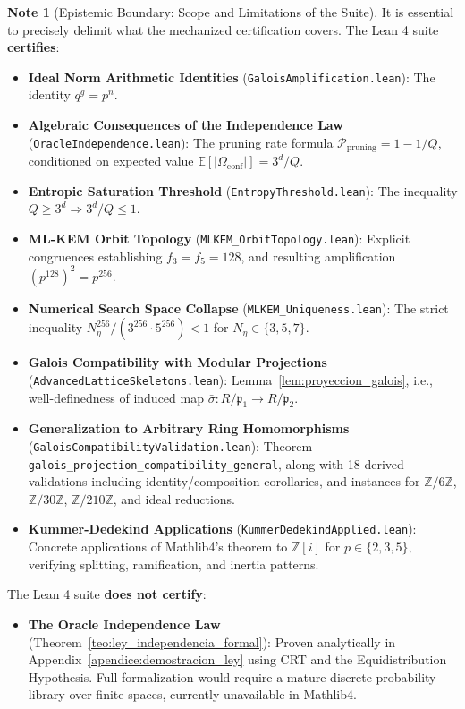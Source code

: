 \documentclass[11pt,a4paper]{article}
\theoremstyle{plain}
\theoremstyle{definition}
\newtheorem{remark}[teorema]{Note}
\numberwithin{equation}{section}
\newcommand{\ZZ}{\mathbb{Z}}
\newcommand{\fkp}{\mathfrak{p}}
\newcommand{\E}{\mathbb{E}}
\begin{document}
\begin{remark}[Epistemic Boundary: Scope and Limitations of the Suite]
\label{rem:frontera_lean}
It is essential to precisely delimit what the mechanized certification covers. The Lean 4 suite \textbf{certifies}:
\begin{itemize}
    \item \textbf{Ideal Norm Arithmetic Identities} (\texttt{GaloisAmplification.lean}): The identity $q^g = p^n$.
    \item \textbf{Algebraic Consequences of the Independence Law} (\texttt{OracleIndependence.lean}): The pruning rate formula $\mathcal{P}_{\text{pruning}} = 1 - 1/Q$, conditioned on expected value $\E[|\Omega_{\text{conf}}|] = 3^d/Q$.
    \item \textbf{Entropic Saturation Threshold} (\texttt{EntropyThreshold.lean}): The inequality $Q \ge 3^d \Rightarrow 3^d/Q \le 1$.
    \item \textbf{ML-KEM Orbit Topology} (\texttt{MLKEM\_OrbitTopology.lean}): Explicit congruences establishing $f_3 = f_5 = 128$, and resulting amplification $(p^{128})^2 = p^{256}$.
    \item \textbf{Numerical Search Space Collapse} (\texttt{MLKEM\_Uniqueness.lean}): The strict inequality $N_\eta^{256}/(3^{256} \cdot 5^{256}) < 1$ for $N_\eta \in \{3, 5, 7\}$.
    \item \textbf{Galois Compatibility with Modular Projections} (\texttt{AdvancedLatticeSkeletons.lean}): Lemma~\ref{lem:proyeccion_galois}, i.e., well-definedness of induced map $\bar{\sigma}: R/\fkp_1 \to R/\fkp_2$.
    \item \textbf{Generalization to Arbitrary Ring Homomorphisms} (\texttt{GaloisCompatibilityValidation.lean}): Theorem \texttt{galois\_projection\_compatibility\_general}, along with 18 derived validations including identity/composition corollaries, and instances for $\ZZ/6\ZZ$, $\ZZ/30\ZZ$, $\ZZ/210\ZZ$, and ideal reductions.
    \item \textbf{Kummer-Dedekind Applications} (\texttt{KummerDedekindApplied.lean}): Concrete applications of Mathlib4's theorem to $\ZZ[i]$ for $p \in \{2, 3, 5\}$, verifying splitting, ramification, and inertia patterns.
\end{itemize}
The Lean 4 suite \textbf{does not certify}:
\begin{itemize}
    \item \textbf{The Oracle Independence Law} (Theorem~\ref{teo:ley_independencia_formal}): Proven analytically in Appendix~\ref{apendice:demostracion_ley} using CRT and the Equidistribution Hypothesis. Full formalization would require a mature discrete probability library over finite spaces, currently unavailable in Mathlib4.

\end{itemize}
\end{remark}
\end{document}

